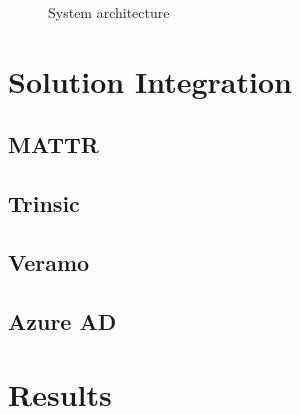     \begin{figure}[ht]
        \centering
        \caption{System architecture}
        \label{figure: sys architecture}
    \end{figure}
    
    \vfill
    
    \section{Solution Integration}\label{section: integration}
    \subsection{MATTR}\label{subsection: mattr}
    \subsection{Trinsic}\label{subsection: trinsic}
    \subsection{Veramo}\label{subsection: veramo}
    \subsection{Azure AD}\label{subsection: azure}
    \section{Results}\label{section: ri-results}